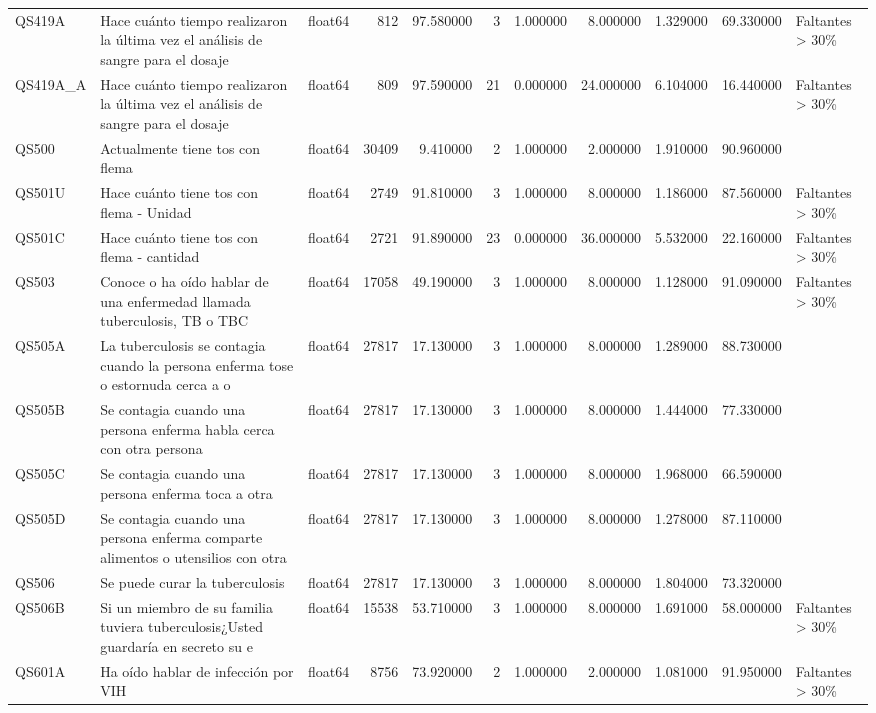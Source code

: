 \begin{longtable}{lllrrrrrrrl}
QS419A & Hace cuánto tiempo realizaron la última vez el análisis de sangre para el dosaje & float64 & 812 & 97.580000 & 3 & 1.000000 & 8.000000 & 1.329000 & 69.330000 & Faltantes > 30\% \\
QS419A\_A & Hace cuánto tiempo realizaron la última vez el análisis de sangre para el dosaje & float64 & 809 & 97.590000 & 21 & 0.000000 & 24.000000 & 6.104000 & 16.440000 & Faltantes > 30\% \\
QS500 & Actualmente tiene tos con flema & float64 & 30409 & 9.410000 & 2 & 1.000000 & 2.000000 & 1.910000 & 90.960000 &  \\
QS501U & Hace cuánto tiene tos con flema - Unidad & float64 & 2749 & 91.810000 & 3 & 1.000000 & 8.000000 & 1.186000 & 87.560000 & Faltantes > 30\% \\
QS501C & Hace cuánto tiene tos con flema - cantidad & float64 & 2721 & 91.890000 & 23 & 0.000000 & 36.000000 & 5.532000 & 22.160000 & Faltantes > 30\% \\
QS503 & Conoce o ha oído hablar de una enfermedad llamada tuberculosis, TB o TBC & float64 & 17058 & 49.190000 & 3 & 1.000000 & 8.000000 & 1.128000 & 91.090000 & Faltantes > 30\% \\
QS505A & La tuberculosis se contagia cuando la persona enferma tose o estornuda cerca a o & float64 & 27817 & 17.130000 & 3 & 1.000000 & 8.000000 & 1.289000 & 88.730000 &  \\
QS505B & Se contagia cuando una persona enferma habla cerca con otra persona & float64 & 27817 & 17.130000 & 3 & 1.000000 & 8.000000 & 1.444000 & 77.330000 &  \\
QS505C & Se contagia cuando una persona enferma toca a otra & float64 & 27817 & 17.130000 & 3 & 1.000000 & 8.000000 & 1.968000 & 66.590000 &  \\
QS505D & Se contagia cuando una persona enferma comparte alimentos o utensilios con otra  & float64 & 27817 & 17.130000 & 3 & 1.000000 & 8.000000 & 1.278000 & 87.110000 &  \\
QS506 & Se puede curar la tuberculosis & float64 & 27817 & 17.130000 & 3 & 1.000000 & 8.000000 & 1.804000 & 73.320000 &  \\
QS506B & Si un miembro de su familia tuviera tuberculosis¿Usted guardaría en secreto su e & float64 & 15538 & 53.710000 & 3 & 1.000000 & 8.000000 & 1.691000 & 58.000000 & Faltantes > 30\% \\
QS601A & Ha oído hablar de infección por VIH & float64 & 8756 & 73.920000 & 2 & 1.000000 & 2.000000 & 1.081000 & 91.950000 & Faltantes > 30\% \\

\end{longtable}
